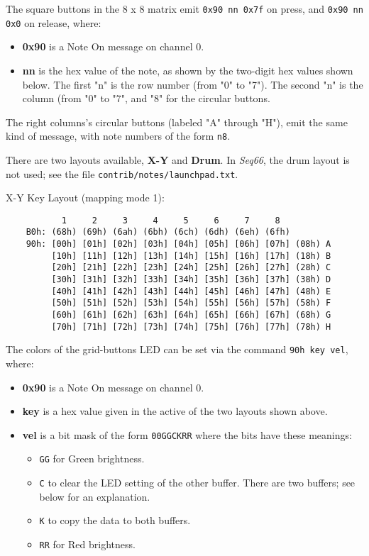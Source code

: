    The square buttons in the 8 x 8 matrix emit
   \texttt{0x90 nn 0x7f} on press, and \texttt{0x90 nn 0x0} on release, where:

   \begin{itemize}
      \item \textbf{0x90}
         is a Note On message on channel 0.
      \item \textbf{nn}
         is the hex value of the note, as shown by the two-digit hex values
            shown below.  The first "n" is the row number (from "0" to "7").
            The second "n" is the column (from "0" to "7", and "8" for the
            circular buttons.
   \end{itemize}

   The right columns's circular buttons (labeled "A" through "H"),
   emit the same kind of message, with note numbers of the form
   \texttt{n8}.

   There are two layouts available, \textbf{X-Y} and \textbf{Drum}.
   In \textsl{Seq66}, the drum layout is not used; see the
   file \texttt{contrib/notes/launchpad.txt}.

   X-Y Key Layout (mapping mode 1):

   \begin{verbatim}
           1     2     3     4     5     6     7     8 
    B0h: (68h) (69h) (6ah) (6bh) (6ch) (6dh) (6eh) (6fh)
    90h: [00h] [01h] [02h] [03h] [04h] [05h] [06h] [07h] (08h) A
         [10h] [11h] [12h] [13h] [14h] [15h] [16h] [17h] (18h) B
         [20h] [21h] [22h] [23h] [24h] [25h] [26h] [27h] (28h) C
         [30h] [31h] [32h] [33h] [34h] [35h] [36h] [37h] (38h) D
         [40h] [41h] [42h] [43h] [44h] [45h] [46h] [47h] (48h) E
         [50h] [51h] [52h] [53h] [54h] [55h] [56h] [57h] (58h) F
         [60h] [61h] [62h] [63h] [64h] [65h] [66h] [67h] (68h) G
         [70h] [71h] [72h] [73h] [74h] [75h] [76h] [77h] (78h) H
   \end{verbatim}

   The colors of the grid-buttons LED can be set via the command
   \texttt{90h key vel}, where:

   \begin{itemize}
      \item \textbf{0x90}
         is a Note On message on channel 0.
      \item \textbf{key} is a hex value given in the active of the
         two layouts shown above.
      \item \textbf{vel} is a bit mask of the form \texttt{00GGCKRR} where the
         bits have these meanings:
         \begin{itemize}
            \item \texttt{GG} for Green brightness.
            \item \texttt{C} to clear the LED setting of the other buffer.
               There are two buffers; see below for an explanation.
            \item \texttt{K} to copy the data to both buffers.
            \item \texttt{RR} for Red brightness.
         \end{itemize}
   \end{itemize}

